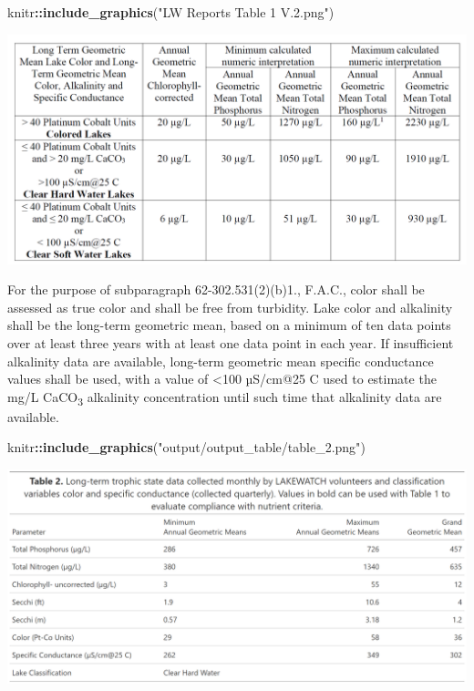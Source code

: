 \documentclass[
]{article}
\newenvironment{Shaded}{\begin{snugshade}}{\end{snugshade}}
\newcommand{\FunctionTok}[1]{\textcolor[rgb]{0.13,0.29,0.53}{\textbf{#1}}}
\newcommand{\NormalTok}[1]{#1}
\newcommand{\SpecialCharTok}[1]{\textcolor[rgb]{0.81,0.36,0.00}{\textbf{#1}}}
\newcommand{\StringTok}[1]{\textcolor[rgb]{0.31,0.60,0.02}{#1}}
\begin{document}
\begin{Shaded}
\begin{Highlighting}[]
\NormalTok{knitr}\SpecialCharTok{::}\FunctionTok{include\_graphics}\NormalTok{(}\StringTok{"LW Reports Table 1 V.2.png"}\NormalTok{)}
\end{Highlighting}
\end{Shaded}

\includegraphics[width=21.97in]{LW Reports Table 1 V.2}

For the purpose of subparagraph 62-302.531(2)(b)1., F.A.C., color shall
be assessed as true color and shall be free from turbidity. Lake color
and alkalinity shall be the long-term geometric mean, based on a minimum
of ten data points over at least three years with at least one data
point in each year. If insufficient alkalinity data are available,
long-term geometric mean specific conductance values shall be used, with
a value of \textless100 µS/cm@25 C used to estimate the mg/L
CaCO\textsubscript{3} alkalinity concentration until such time that
alkalinity data are available.

\begin{Shaded}
\begin{Highlighting}[]
\NormalTok{knitr}\SpecialCharTok{::}\FunctionTok{include\_graphics}\NormalTok{(}\StringTok{"output/output\_table/table\_2.png"}\NormalTok{)}
\end{Highlighting}
\end{Shaded}

\includegraphics[width=27.39in]{output/output_table/table_2}
\end{document}
